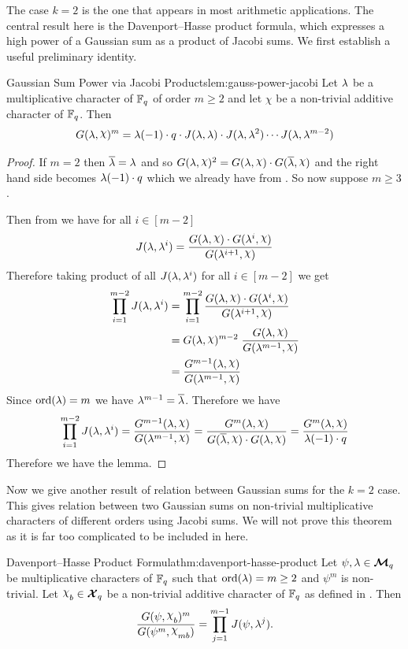 The case $k=2$ is the one that appears in most arithmetic applications. The central result here is the Davenport--Hasse product formula, which expresses a high power of a Gaussian sum as a product of Jacobi sums. We first establish a useful preliminary identity.
\begin{lemma}{Gaussian Sum Power via Jacobi Products}{lem:gauss-power-jacobi}
  Let $\lambda$ be a multiplicative character of $\mathbb{F}_q$ of order $m\geq 2$ and let $\chi$ be a non-trivial additive character of $\mathbb{F}_q$. Then $$G(\lm,\chi)^m=\lm(-1)\cdot q\cdot J(\lm,\lm)\cdot J(\lm,\lm^2)\cdots J(\lm,\lm^{m-2})$$ 
\end{lemma}
\begin{proof}
  If $m=2$ then $\overline{\lambda}=\lambda$ and so $G(\lm,\chi)^2=G(\lm,\chi)\cdot G(\ov{\lm},\chi)$ and the right hand side becomes $\lambda(-1)\cdot q$ which we already have from . So now suppose $m\geq 3$. 

  Then from  we have for all $i\in[m-2]$ $$J(\lm,\lm^i)=\frac{G(\lm,\chi)\cdot G(\lm^i,\chi)}{G(\lm^{i+1},\chi)}$$ Therefore taking product of all $J(\lambda,\lambda^i)$ for all $i\in[m-2]$ we get \begin{align*}
    \prod_{i=1}^{m-2}J(\lm,\lm^i) & = \prod_{i=1}^{m-2}\frac{G(\lm,\chi)\cdot G(\lm^i,\chi)}{G(\lm^{i+1},\chi)}\\ 
    & =G(\lm,\chi)^{m-2}\; \frac{G(\lm,\chi)}{G(\lm^{m-1},\chi)}\\ 
    & = \frac{G^{m-1}(\lm,\chi)}{G(\lm^{m-1},\chi)}
  \end{align*}
  Since $\operatorname{ord}(\lambda)=m$ we have $\lambda^{m-1}=\overline{\lambda}$. Therefore we have $$\prod_{i=1}^{m-2}J(\lm,\lm^i)=\frac{G^{m-1}(\lm,\chi)}{G(\lm^{m-1},\chi)}=\frac{G^m(\lm,\chi)}{G(\ov{\lm},\chi)\cdot G(\lm,\chi)}= \frac{G^m(\lm,\chi)}{\lm(-1)\cdot q}$$Therefore we have the lemma. 
\end{proof}

Now we give another result of relation between Gaussian sums for the $k=2$ case. This gives relation between two Gaussian sums on non-trivial multiplicative characters of different orders using Jacobi sums. We will not prove this theorem as it is far too complicated to be included in here. 
\begin{Theorem}{Davenport--Hasse Product Formula}{thm:davenport-hasse-product}%
  Let $\psi,\lambda\in\boldsymbol{\mathcal{M}}_q$ be multiplicative characters of $\mathbb{F}_q$ such that $\operatorname{ord}(\lambda)=m\geq 2$ and $\psi^m$ is non-trivial. Let $\chi_b\in\Xq$ be a non-trivial additive character of $\mathbb{F}_q$ as defined in . Then $$\frac{G(\psi,\chi_b)^m}{G(\psi^m,\chi_{mb})} =\prod_{j=1}^{m-1}J(\psi,\lm^j).$$
\end{Theorem}

